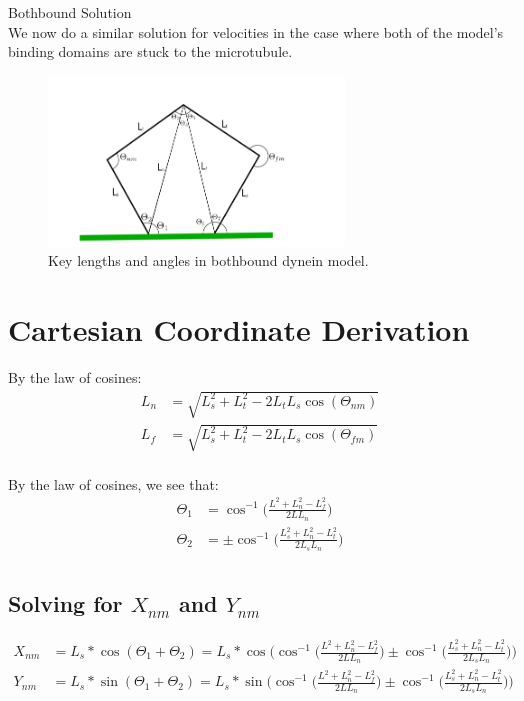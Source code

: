 \documentclass[11pt, landscape]{article}
\begin{document}
\clearpage
{\huge Bothbound Solution} \\
We now do a similar solution for velocities in the case where both of the model's binding domains are stuck to the microtubule.

\begin{figure}[h!]
  \caption{Key lengths and angles in bothbound dynein model.}
  \centering
    \includegraphics[width=0.7\textwidth]{../figures/bothbound_model.png}
\end{figure}

\section{Cartesian Coordinate Derivation}

By the law of cosines:
\begin{align}
  L_n &= \sqrt{L_{s}^2+L_{t}^2-2L_{t}L_{s}\cos(\Theta_{nm})}\\
  L_f &= \sqrt{L_{s}^2+L_{t}^2-2L_{t}L_{s}\cos(\Theta_{fm})}\\
\end{align}

By the law of cosines, we see that:
\begin{align}
  \Theta_{1} &= \cos^{-1}\bigg(\frac{L^2+L_{n}^2-L_{f}^2}{2LL_{n}}\bigg) \\
  \Theta_{2} &= \pm\cos^{-1}\bigg(\frac{L_{s}^2+L_{n}^2-L_{t}^2}{2L_{s}L_{n}}\bigg) \\
\end{align}

\subsection{Solving for $X_{nm}$ and $Y_{nm}$}

\begin{align}
  X_{nm} &= L_{s}*\cos(\Theta_{1}+\Theta_{2}) =
     L_{s}*\cos\Bigg(\cos^{-1}\bigg(\frac{L^2+L_{n}^2-L_{f}^2}{2LL_{n}}\bigg)
     \pm \cos^{-1}\bigg(\frac{L_{s}^2+L_{n}^2-L_{t}^2}{2L_{s}L_{n}}\bigg)\Bigg) \\
  Y_{nm} &= L_{s}*\sin(\Theta_{1}+\Theta_{2}) =
     L_{s}*\sin\Bigg(\cos^{-1}\bigg(\frac{L^2+L_{n}^2-L_{f}^2}{2LL_{n}}\bigg)
     \pm \cos^{-1}\bigg(\frac{L_{s}^2+L_{n}^2-L_{t}^2}{2L_{s}L_{n}}\bigg)\Bigg) \\
\end{align}
\end{document}
